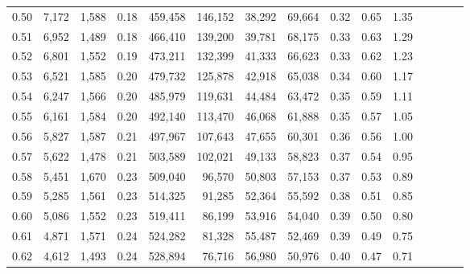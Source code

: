 \begin{tabular}{rrrcrrrrrrrrrrr}
0.50 &   7,172 &   1,588 &                                       0.18 &  459,458 &  146,152 &   38,292 &   69,664 &  0.32 &  0.65 &                         1.35 \\
0.51 &   6,952 &   1,489 &                                       0.18 &  466,410 &  139,200 &   39,781 &   68,175 &  0.33 &  0.63 &                         1.29 \\
0.52 &   6,801 &   1,552 &                                       0.19 &  473,211 &  132,399 &   41,333 &   66,623 &  0.33 &  0.62 &                         1.23 \\
0.53 &   6,521 &   1,585 &                                       0.20 &  479,732 &  125,878 &   42,918 &   65,038 &  0.34 &  0.60 &                         1.17 \\
0.54 &   6,247 &   1,566 &                                       0.20 &  485,979 &  119,631 &   44,484 &   63,472 &  0.35 &  0.59 &                         1.11 \\
0.55 &   6,161 &   1,584 &                                       0.20 &  492,140 &  113,470 &   46,068 &   61,888 &  0.35 &  0.57 &                         1.05 \\
0.56 &   5,827 &   1,587 &                                       0.21 &  497,967 &  107,643 &   47,655 &   60,301 &  0.36 &  0.56 &                         1.00 \\
0.57 &   5,622 &   1,478 &                                       0.21 &  503,589 &  102,021 &   49,133 &   58,823 &  0.37 &  0.54 &                         0.95 \\
0.58 &   5,451 &   1,670 &                                       0.23 &  509,040 &   96,570 &   50,803 &   57,153 &  0.37 &  0.53 &                         0.89 \\
0.59 &   5,285 &   1,561 &                                       0.23 &  514,325 &   91,285 &   52,364 &   55,592 &  0.38 &  0.51 &                         0.85 \\
0.60 &   5,086 &   1,552 &                                       0.23 &  519,411 &   86,199 &   53,916 &   54,040 &  0.39 &  0.50 &                         0.80 \\
0.61 &   4,871 &   1,571 &                                       0.24 &  524,282 &   81,328 &   55,487 &   52,469 &  0.39 &  0.49 &                         0.75 \\
0.62 &   4,612 &   1,493 &                                       0.24 &  528,894 &   76,716 &   56,980 &   50,976 &  0.40 &  0.47 &                         0.71 \\

\end{tabular}
